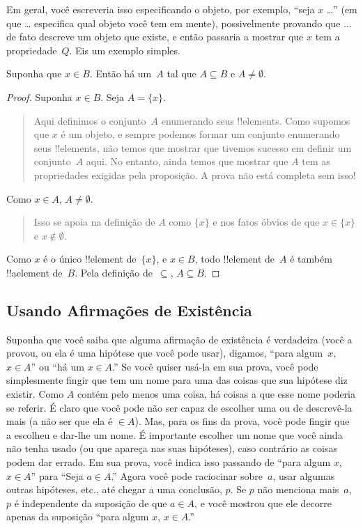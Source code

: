 \documentclass[../../../include/open-logic-section]{subfiles}
\begin{document}
Em geral, você escreveria isso especificando o objeto, por exemplo, ``seja
$x$ \dots'' (em que \dots{} especifica qual objeto você tem em
mente), possivelmente provando que $\dots$ de fato descreve um objeto que
existe, e então passaria a mostrar que $x$ tem a propriedade~$Q$. Eis um
exemplo simples.

\begin{prop}
  Suponha que $x \in B$. Então há um~$A$ tal que $A \subseteq
  B$ e $A \neq \emptyset$.
\end{prop}

\begin{proof}
  Suponha $x \in B$. Seja $A = \{x\}$.
  \begin{quote}
    Aqui definimos o conjunto~$A$ enumerando seus
    !!{element}s. Como supomos que $x$ é um objeto, e sempre podemos
    formar um conjunto enumerando seus !!{element}s, não temos
    que mostrar que tivemos sucesso em definir um conjunto~$A$ aqui.  No entanto,
    ainda temos que mostrar que $A$ tem as propriedades exigidas pela
    proposição. A prova não está completa sem isso!{}
  \end{quote}
  Como $x \in A$, $A \neq \emptyset$.
  \begin{quote}
    Isso se apoia na definição de $A$ como $\{x\}$ e nos fatos óbvios
    de que $x \in \{x\}$ e $x \notin \emptyset$.
  \end{quote}
  Como $x$ é o único !!{element} de~$\{x\}$, e $x \in B$, todo
  !!{element} de~$A$ é também !!a{element} de~$B$. Pela definição
  de~$\subseteq$, $A \subseteq B$.
\end{proof}

\subsection{Usando Afirmações de Existência}

Suponha que você saiba que alguma afirmação de existência é verdadeira (você a provou,
ou ela é uma hipótese que você pode usar), digamos, ``para algum~$x$, $x \in A$'' ou
``há um $x \in A$.''  Se você quiser usá-la em sua prova, você
pode simplesmente fingir que tem um nome para uma das coisas que sua
hipótese diz existir. Como $A$ contém pelo menos uma coisa, há
coisas a que esse nome poderia se referir. É claro que você pode não ser
capaz de escolher uma ou de descrevê-la mais (a não ser que ela é
$\in A$). Mas, para os fins da prova, você pode fingir que
a escolheu e dar-lhe um nome. É importante escolher um
nome que você ainda não tenha usado (ou que apareça nas suas
hipóteses), caso contrário as coisas podem dar errado. Em sua prova, você
indica isso passando de ``para algum $x$, $x \in A$'' para ``Seja $a
\in A$.''  Agora você pode raciocinar sobre~$a$, usar algumas outras hipóteses, etc.,
até chegar a uma conclusão, $p$. Se $p$ não menciona mais~$a$, $p$ é
independente da suposição de que $a \in A$, e você mostrou que ele
decorre apenas da suposição ``para algum $x$, $x \in A$.''
\end{document}
